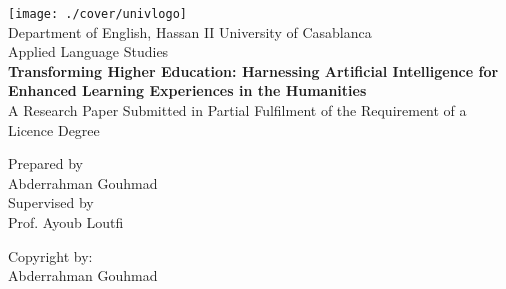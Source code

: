 \begin{titlepage}
  \centering
  \texttt{[image: ./cover/univlogo]} \\
  \centering
  Department of English, Hassan II University of Casablanca \\
  Applied Language Studies \\
  \vspace*{2cm}
  \textbf{\huge Transforming Higher Education: Harnessing Artificial Intelligence for Enhanced Learning Experiences in the Humanities} \\
  \vspace*{2cm}
  A Research Paper Submitted in Partial Fulfilment of the Requirement of a Licence Degree \\
  \vspace*{3.5cm}

  \begin{center}
    Prepared by\\ Abderrahman
    Gouhmad\\ Supervised by \\
    Prof. Ayoub Loutfi \\
  \end{center}
  \newpage
  \thispagestyle{empty}
  \vspace*{20cm}
  Copyright by:\\
  Abderrahman Gouhmad \\
  \vspace*{\fill}
  \mydate
\end{titlepage}
